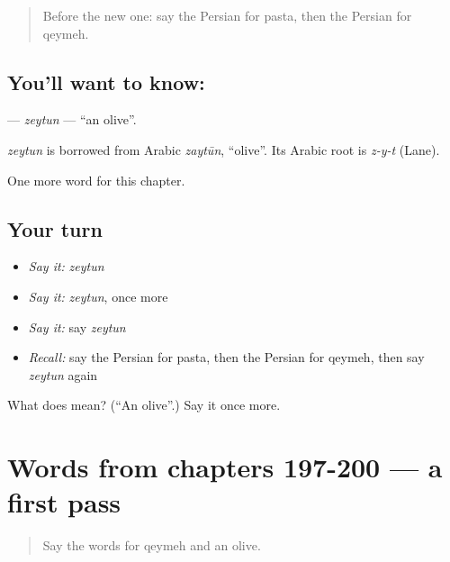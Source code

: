 \begin{quote}
Before the new one: say the Persian for pasta, then the Persian for qeymeh.
\end{quote}

\subsection*{You'll want to know: }
\textbf{} — \emph{zeytun} — \textquotedblleft{}an olive\textquotedblright{}.

\begin{cousinweb}
\emph{zeytun} is borrowed from Arabic \emph{zaytūn}, \textquotedblleft{}olive\textquotedblright{}. Its Arabic root is \emph{z-y-t} (Lane).
\end{cousinweb}

\begin{grammarlens}[title={What you've built}]
One more word for this chapter.
\end{grammarlens}

\subsection*{Your turn}
\begin{itemize}
\raggedright
  \item \emph{Say it:} \emph{zeytun}
  \item \emph{Say it:} \emph{zeytun}, once more
  \item \emph{Say it:} say \emph{zeytun}
  \item \emph{Recall:} say the Persian for pasta, then the Persian for qeymeh, then say \emph{zeytun} again
\end{itemize}

\begin{tcolorbox}[breakable,colback=teal!4,colframe=teal!35!black,title={Before you move on}]
What does  mean? (\textquotedblleft{}An olive\textquotedblright{}.) Say it once more.
\end{tcolorbox}
\section[(dialogue)]{Words from chapters 197-200 — a first pass}

\label{lesson:FA-R205-first-pass-words-from-chapters-197-200}



\begin{quote}
Say the words for qeymeh and an olive.
\end{quote}

